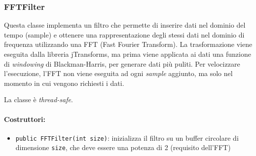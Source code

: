 \subsubsection{FFTFilter}
Questa classe implementa un filtro che permette di inserire dati nel dominio del tempo (sample) e ottenere una rappresentazione degli stessi dati nel dominio di frequenza utilizzando una FFT (Fast Fourier Transform). La trasformazione viene eseguita dalla libreria jTransforms, ma prima viene applicata ai dati una funzione di \textit{windowing} di Blackman-Harris, per generare dati più puliti. Per velocizzare l'esecuzione, l'FFT non viene eseguita ad ogni \textit{sample} aggiunto, ma solo nel momento in cui vengono richiesti i dati.

La classe è \textit{thread-safe}.

\paragraph{Costruttori:}\begin{itemize}
	\item \texttt{public FFTFilter(int size)}: inizializza il filtro su un buffer circolare di dimensione \texttt{size}, che deve essere una potenza di 2 (requisito dell'FFT)
\end{itemize}

